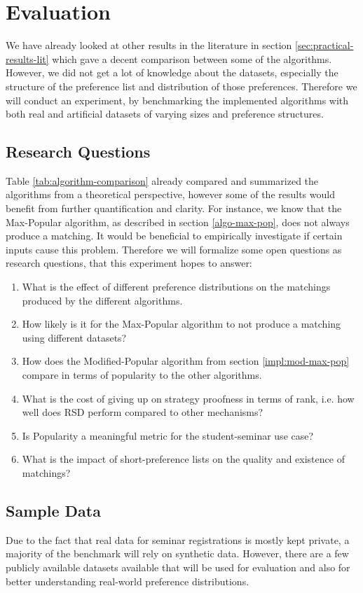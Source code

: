 \section{Evaluation}\label{sec:evaluation}
We have already looked at other results in the literature in section \ref{sec:practical-results-lit} which gave a decent comparison between some of the algorithms. However, we did not get a lot of knowledge about the datasets, especially the structure of the preference list and distribution of those preferences. Therefore we will conduct an experiment, by benchmarking the implemented algorithms with both real and artificial datasets of varying sizes and preference structures.

\subsection{Research Questions}\label{sec:research-q}
Table \ref{tab:algorithm-comparison} already compared and summarized the algorithms from a theoretical perspective, however some of the results would benefit from further quantification and clarity. For instance, we know that the Max-Popular algorithm, as described in section \ref{algo-max-pop}, does not always produce a matching. It would be beneficial to empirically investigate if certain inputs cause this problem. Therefore we will formalize some open questions as research questions, that this experiment hopes to answer:
\begin{enumerate}
    \item What is the effect of different preference distributions on the matchings produced by the different algorithms.
    \item How likely is it for the Max-Popular algorithm to not produce a matching using different datasets?
    \item How does the Modified-Popular algorithm from section \ref{impl:mod-max-pop} compare in terms of popularity to the other algorithms.
    \item What is the cost of giving up on strategy proofness in terms of rank, i.e. how well does RSD perform compared to other mechanisms?
    \item Is Popularity a meaningful metric for the student-seminar use case?
    \item What is the impact of short-preference lists on the quality and existence of matchings?
\end{enumerate}

\subsection{Sample Data}
Due to the fact that real data for seminar registrations is mostly kept private, a majority of the benchmark will rely on synthetic data. However, there are a few publicly available datasets available that will be used for evaluation and also for better understanding real-world preference distributions.

